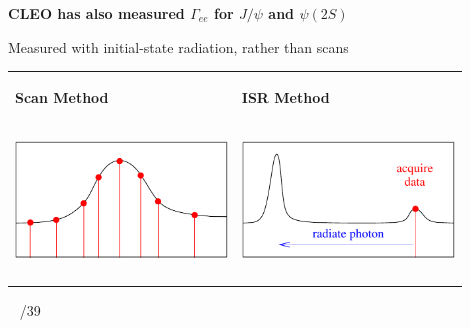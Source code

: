 \documentclass[landscape]{article}
\newenvironment{slide}[1][ ]{}{\mbox{ } \hfill \arabic{page}/39 \pagebreak}
\begin{document}

\begin{slide}
{\Huge \bf \boldmath CLEO has also measured $\Gamma_{ee}$ for $J/\psi$ and $\psi(2S)$}

\vspace{0.75 cm}
Measured with initial-state radiation, rather than scans

\vfill
\begin{center}
\begin{tabular}{p{0.45\linewidth} p{0.45\linewidth}}
\begin{minipage}{\linewidth} \begin{center} \bf Scan Method \end{center} \end{minipage} &
\begin{minipage}{\linewidth} \begin{center} \bf ISR Method \end{center} \end{minipage} \\
\begin{minipage}{\linewidth} \begin{center} \includegraphics[width=0.8\linewidth]{signify_scan} \end{center} \end{minipage} &
\begin{minipage}{\linewidth} \begin{center} \includegraphics[width=0.8\linewidth]{signify_isr} \end{center} \end{minipage} \\
\begin{minipage}{\linewidth}


\end{minipage}
\end{tabular}
\end{center}
\end{slide}
\end{document}
